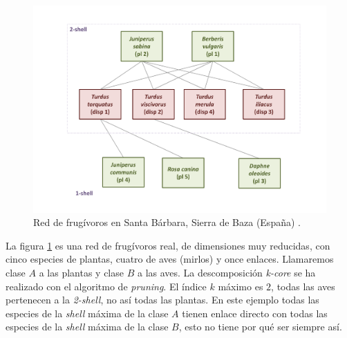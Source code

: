 \begin{figure}[h!]
\centering
\includegraphics[scale=0.52]{Figures/ESTATICA_SD_030_example_network.pdf}
\caption {Red de frugívoros en Santa Bárbara, Sierra de Baza (España) \cite{jordano1993geographical}.}
\label{fig:ESTATICA_red_example}
\end{figure}

%

La figura \ref{fig:ESTATICA_red_example} es una red de frugívoros real, de dimensiones muy reducidas, con cinco especies de plantas, cuatro de aves (mirlos) y once enlaces. Llamaremos clase $A$ a las plantas y clase $B$ a las aves. La descomposición \textit{k-core} se ha realizado con el algoritmo de \textit{pruning}. El índice $k$ máximo es $2$, todas las aves pertenecen a la \textit{2-shell}, no así todas las plantas. En este ejemplo todas las especies de la \textit{shell} máxima de la clase $A$ tienen enlace directo con todas las especies de la \textit{shell} máxima de la clase $B$, esto no tiene por qué ser siempre así. 

